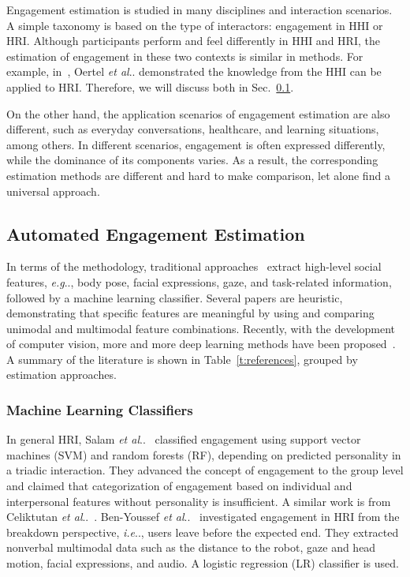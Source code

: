 \documentclass[10pt,journal,compsoc]{IEEEtran}
\makeatletter
\DeclareRobustCommand\onedot{\futurelet\@let@token\@onedot}
\def\@onedot{\ifx\@let@token.\else.\null\fi\xspace}
\def\eg{\emph{e.g}\onedot} \def\Eg{\emph{E.g}\onedot}
\def\ie{\emph{i.e}\onedot} \def\Ie{\emph{I.e}\onedot}
\def\etal{\emph{et al}\onedot}
\makeatother
\begin{document}
Engagement estimation is studied in many disciplines and interaction scenarios. A simple taxonomy is based on the type of interactors: engagement in HHI or HRI. Although participants perform and feel differently in HHI and HRI, the estimation of engagement in these two contexts is similar in methods. For example, in~\cite{Oertel2021EngagementAware}, Oertel \etal demonstrated the knowledge from the HHI can be applied to HRI. Therefore, we will discuss both in Sec.~\ref{subs:Automated_Engagement_Estimation}.

On the other hand, the application scenarios of engagement estimation are also different, such as everyday conversations, healthcare, and learning situations, among others. In different scenarios, engagement is often expressed differently, while the dominance of its components varies. As a result, the corresponding estimation methods are different and hard to make comparison, let alone find a universal approach.

\subsection{Automated Engagement Estimation}
\label{subs:Automated_Engagement_Estimation}

In terms of the methodology, traditional approaches~\cite{Salam2017Fully, Celiktutan2019Multimodal, BenYoussef2019Early, Monkaresi2017Automated, Gao2020NGage} extract high-level social features, \eg, body pose, facial expressions, gaze, and task-related information, followed by a machine learning classifier. Several papers are heuristic, demonstrating that specific features are meaningful by using and comparing unimodal and multimodal feature combinations. Recently, with the development of computer vision, more and more deep learning methods have been proposed~\cite{Saleh2021Improving, DelDuchetto2020Are, Zhu2020Multirate, Guhan2020ABCNet, Rudovic2019Personalized, Sumer2021Multimodal, Anagnostopoulou2021Engagement}. A summary of the literature is shown in Table~\ref{t:references}, grouped by estimation approaches.

\subsubsection{Machine Learning Classifiers}

In general HRI, Salam \etal~\cite{Salam2017Fully} classified engagement using support vector machines (SVM) and random forests (RF), depending on predicted personality in a triadic interaction. They advanced the concept of engagement to the group level and claimed that categorization of engagement based on individual and interpersonal features without personality is insufficient. A similar work is from Celiktutan \etal~\cite{Celiktutan2019Multimodal}. Ben-Youssef \etal~\cite{BenYoussef2019Early} investigated engagement in HRI from the breakdown perspective, \ie, users leave before the expected end. They extracted nonverbal multimodal data such as the distance to the robot, gaze and head motion, facial expressions, and audio. A logistic regression (LR) classifier is used. 
\end{document}
